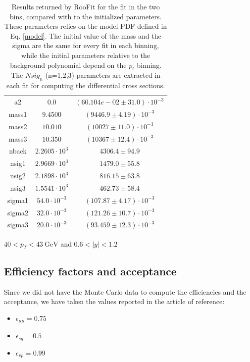 \documentclass[a4paper,11pt]{article}
\begin{document}
\begin{table}[!h]
\begin{subtable}{.47\linewidth}
{\begin{tabular}{c|c|c}
                    a2  &   $0.0$   &  $(60.104e-02 \pm  31.0)\cdot10^{-3}$  \\
                 mass1  &  $9.4500$    &  $(9446.9 \pm  4.19)\cdot10^{-3}$  \\
                 mass2  &  $10.010$    &  $(10027 \pm  11.0)\cdot10^{-3}$  \\
                 mass3  &  $10.350$    &  $(10367 \pm  12.4)\cdot10^{-3}$ \\
                 nback  &  $2.2605\cdot10^3$  &  $4306.4 \pm  94.9$  \\
                 nsig1  &  $2.9669\cdot10^3$  &  $1479.0 \pm  55.8$  \\
                 nsig2  &  $2.1898\cdot10^3$  &  $816.15 \pm  63.8$  \\
                 nsig3  &  $1.5541\cdot10^3$  &  $462.73 \pm  58.4$  \\
                sigma1  &  $54.0\cdot10^{-3}$    &  $(107.87 \pm  4.17)\cdot10^{-3}$  \\
                sigma2  &  $32.0\cdot10^{-3}$    &  $(121.26 \pm  10.7)\cdot10^{-3}$  \\
                sigma3  &  $20.0\cdot10^{-3}$    &  $(93.459 \pm  12.3)\cdot10^{-3}$  \\
    \end{tabular}%
    }
    \egroup%
    \caption{$40<p_T<\SI{43}{\giga\eV}$ and $0.6<|y|<1.2$}
    \end{subtable}
    \caption{Results returned by RooFit for the fit in the two bins, compared with to the initialized parameters. These parameters relies on the model PDF defined in Eq. \eqref{model}. The initial value of the mass and the sigma are the same for every fit in each binning, while the initial parameters relative to the background polynomial depend on the $p_t$ binning. The $Nsig_n$ (n=1,2,3) parameters are extracted in each fit for computing the differential cross sections.}
        \label{tab:fig2}
\end{table}

\subsection{Efficiency factors and acceptance}
Since we did not have the Monte Carlo data to compute the efficiencies and the acceptance, we have taken the values reported in the article of reference\cite{Khachatryan_2015}:
\begin{itemize}
    \item $\epsilon_{\mu\mu} = 0.75$
    \item $\epsilon_{sg}  = 0.5$
    \item $\epsilon_{vp} = 0.99$
\end{itemize}
\end{document}
